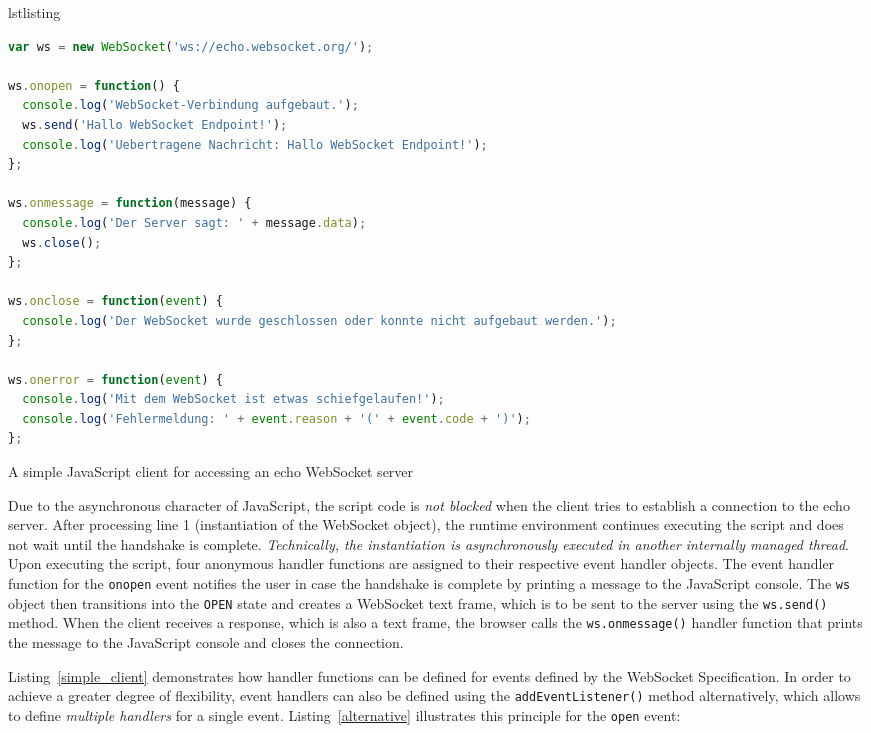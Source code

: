 \documentclass[a4paper, justified, notoc]{tufte-handout} %
\makeatletter
\newenvironment{listing}[1][htbp] %
  {\ifvmode\else\unskip\fi\begin{@tufte@float}[#1]{lstlisting}{}}
  {\end{@tufte@float} } %
\makeatother
\begin{document}
\begin{listing}%
\begin{lstlisting}[language=JavaScript]
var ws = new WebSocket('ws://echo.websocket.org/');

ws.onopen = function() {
  console.log('WebSocket-Verbindung aufgebaut.');
  ws.send('Hallo WebSocket Endpoint!');
  console.log('Uebertragene Nachricht: Hallo WebSocket Endpoint!');
};

ws.onmessage = function(message) {
  console.log('Der Server sagt: ' + message.data);
  ws.close();
};

ws.onclose = function(event) {
  console.log('Der WebSocket wurde geschlossen oder konnte nicht aufgebaut werden.');
};

ws.onerror = function(event) {
  console.log('Mit dem WebSocket ist etwas schiefgelaufen!'); 
  console.log('Fehlermeldung: ' + event.reason + '(' + event.code + ')');
};
\end{lstlisting}
	\caption{A simple JavaScript client for accessing an echo WebSocket server} 
	\label{simple_client}
\end{listing}

Due to the asynchronous character of JavaScript, the script code is \emph{not blocked} when the client tries to establish a connection to the echo server. After processing line 1 (instantiation of the WebSocket object), the runtime environment continues executing the script and does not wait until the handshake is complete. \emph{Technically, the instantiation is asynchronously executed in another internally managed thread}. Upon executing the script, four anonymous handler functions are assigned to their respective event handler objects. The event handler function for the \texttt{onopen} event notifies the user in case the handshake is complete by printing a message to the JavaScript console. The \texttt{ws} object then transitions into the \texttt{OPEN} state and creates a WebSocket text frame, which is to be sent to the server using the \texttt{ws.send()} method. When the client receives a response, which is also a text frame, the browser calls the \texttt{ws.onmessage()} handler function that prints the message to the JavaScript console and closes the connection.


Listing~\ref{simple_client} demonstrates how handler functions can be defined for events defined by the WebSocket Specification. In order to achieve a greater degree of flexibility, event handlers can also be defined using the \texttt{addEventListener()} method alternatively, which allows to define \emph{multiple handlers} for a single event.  Listing~\ref{alternative} illustrates this principle for the \texttt{open} event:
\end{document}
